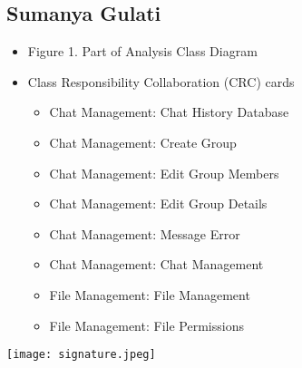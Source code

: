 \documentclass[]{article}
\begin{document}
\subsection{Sumanya Gulati}
\label{subsec:sumanya_gulati}
\begin{itemize}
	\item Figure 1. Part of Analysis Class Diagram
	\item Class Responsibility Collaboration (CRC) cards
 		\begin{itemize}
   			\item Chat Management: Chat History Database
      			\item Chat Management: Create Group
	 		\item Chat Management: Edit Group Members
    			\item Chat Management: Edit Group Details
       			\item Chat Management: Message Error
	  		\item Chat Management: Chat Management
     			\item File Management: File Management
			\item File Management: File Permissions
      		\end{itemize}
\end{itemize}
\texttt{[image: signature.jpeg]}
\end{document}
